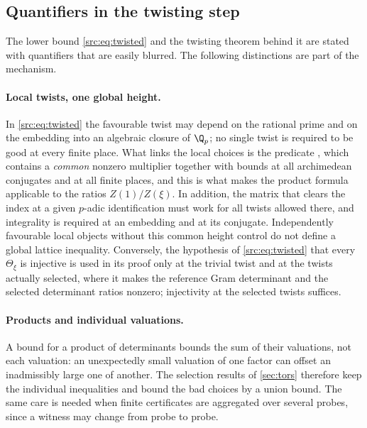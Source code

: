 \subsection{Quantifiers in the twisting step}\label{src:sec:quantifiers}
\begingroup\raggedright
{}
\endgroup

The lower bound \eqref{src:eq:twisted} and the twisting theorem behind it are stated with
quantifiers that are easily blurred. The following distinctions are part of the mechanism.

\paragraph{Local twists, one global height.}
In \eqref{src:eq:twisted} the favourable twist may depend on the rational prime and on the
embedding into an algebraic closure of $\Q_p$; no single twist is required to be good at every
finite place. What links the local choices is the predicate , which contains a
\emph{common} nonzero multiplier together with bounds at all archimedean conjugates and at
all finite places, and this is what makes the product formula applicable to the ratios
$Z(1)/Z(\xi)$. In addition, the matrix that clears the index at a given $p$-adic
identification must work for all twists allowed there, and integrality is required at an
embedding and at its conjugate. Independently favourable local objects without this common
height control do not define a global lattice inequality. Conversely, the hypothesis of
\eqref{src:eq:twisted} that every $\Theta_\xi$ is injective is used in its proof only at the
trivial twist and at the twists actually selected, where it makes the reference Gram
determinant and the selected determinant ratios nonzero; injectivity at the selected twists
suffices.

\paragraph{Products and individual valuations.}
A bound for a product of determinants bounds the sum of their valuations, not each valuation:
an unexpectedly small valuation of one factor can offset an inadmissibly large one of another.
The selection results of \cref{sec:tors} therefore keep the individual inequalities and
bound the bad choices by a union bound. The same care is needed when finite certificates are
aggregated over several probes, since a witness may change from probe to probe.

